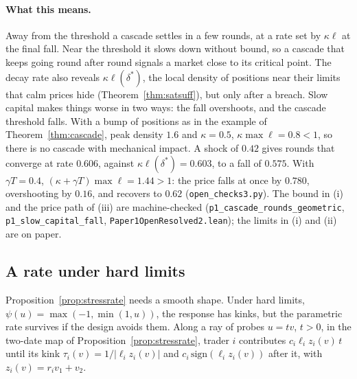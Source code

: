 \documentclass[12pt]{article}
\theoremstyle{definition}
\theoremstyle{remark}
\begin{document}
\paragraph{What this means.} Away from the threshold a cascade settles in a few rounds, at a rate set by $\kappa\ell$ at the final fall. Near the threshold it slows down without bound, so a cascade that keeps going round after round signals a market close to its critical point. The decay rate also reveals $\kappa\ell(\delta^*)$, the local density of positions near their limits that calm prices hide (Theorem~\ref{thm:satsuff}), but only after a breach. Slow capital makes things worse in two ways: the fall overshoots, and the cascade threshold falls. With a bump of positions as in the example of Theorem~\ref{thm:cascade}, peak density $1.6$ and $\kappa=0.5$, $\kappa\max\ell=0.8<1$, so there is no cascade with mechanical impact. A shock of $0.42$ gives rounds that converge at rate $0.606$, against $\kappa\ell(\delta^*)=0.603$, to a fall of $0.575$. With $\gamma T=0.4$, $(\kappa+\gamma T)\max\ell=1.44>1$: the price falls at once by $0.780$, overshooting by $0.16$, and recovers to $0.62$ (\nolinkurl{open_checks3.py}). The bound in (i) and the price path of (iii) are machine-checked (\texttt{p1\_cascade\_rounds\_geometric}, \texttt{p1\_slow\_capital\_fall}, \nolinkurl{Paper1OpenResolved2.lean}); the limits in (i) and (ii) are on paper.

\subsection{A rate under hard limits}

Proposition~\ref{prop:stressrate} needs a smooth shape. Under hard limits, $\psi(u)=\max(-1,\min(1,u))$, the response has kinks, but the parametric rate survives if the design avoids them. Along a ray of probes $u=tv$, $t>0$, in the two-date map of Proposition~\ref{prop:stressrate}, trader $i$ contributes $c_i\ell_iz_i(v)\,t$ until its kink $\tau_i(v)=1/|\ell_iz_i(v)|$ and $c_i\,\mathrm{sign}(\ell_iz_i(v))$ after it, with $z_i(v)=r_iv_1+v_2$.
\end{document}
